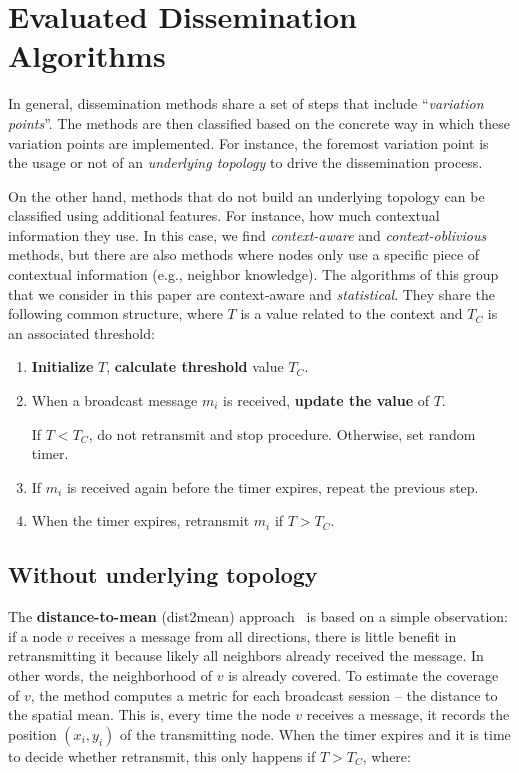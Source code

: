 
\section{Evaluated Dissemination Algorithms}
\label{sec:algorithms}


In general, dissemination methods share a set of steps that include ``\textit{variation points}''.
The methods are then classified based on the concrete way in which these variation points are implemented.
For instance, the foremost variation point is the usage or not of an \textit{underlying topology} to drive the dissemination process.

On the other hand, methods that do not build an underlying topology can be classified using additional features.
For instance, how much contextual information they use.
In this case, we find \textit{context-aware} and \textit{context-oblivious} methods, but there are also methods where nodes only use a specific piece of contextual information (e.g., neighbor knowledge).
The algorithms of this group that we consider in this paper are context-aware and \textit{statistical}.
They share the following common structure, where $T$ is a value related to the context and $T_C$ is an associated threshold:

\begin{enumerate}
	\item \textbf{Initialize} $T$, \textbf{calculate threshold} value $T_C$.
	\item When a broadcast message $m_i$ is received, \textbf{update the value} of $T$.
		  
		  If $T < T_C$, do not retransmit and stop procedure. Otherwise, set random timer.
		  
	\item If $m_i$ is received again before the timer expires, repeat the previous step.
	\item When the timer expires, retransmit $m_i$ if $T > T_C$.
\end{enumerate}

\subsection{Without underlying topology}

The \textbf{distance-to-mean} (dist2mean) approach~\cite{Slavik2011} is based on a simple observation: if a node $v$ receives a message from all directions, there is little benefit in retransmitting it because likely all neighbors already received the message.
In other words, the neighborhood of $v$ is already covered.
To estimate the coverage of $v$, the method computes a metric for each broadcast session -- the distance to the spatial mean.
This is, every time the node $v$ receives a message, it records the position $(x_i, y_i)$ of the transmitting node.
When the timer expires and it is time to decide whether retransmit, this only happens if $T > T_C$, where:

